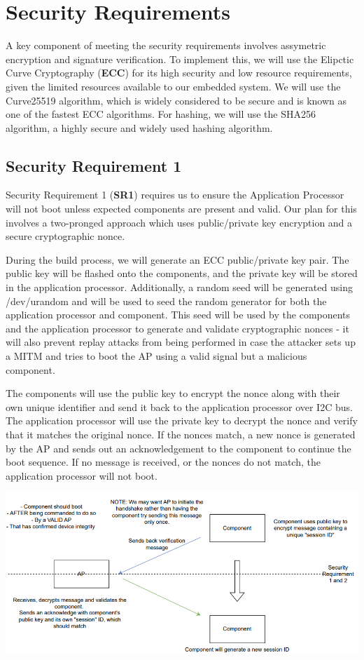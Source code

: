 \documentclass{prace}
\begin{document}
\section{Security Requirements}

A key component of meeting the security requirements involves assymetric encryption and signature
verification. To implement this, we will use the Elipctic Curve Cryptography (\textbf{ECC}) for
its high security and low resource requirements, given the limited resources available to our
embedded system. We will use the Curve25519 algorithm, which is widely considered to be secure
and is known as one of the fastest ECC algorithms. For hashing, we will use the SHA256 algorithm,
a highly secure and widely used hashing algorithm.

\subsection{Security Requirement 1}
Security Requirement 1 (\textbf{SR1}) requires us to ensure the Application Processor will not boot unless
expected components are present and valid. Our plan for this involves a two-pronged approach
which uses public/private key encryption and a secure cryptographic nonce.

During the build process, we will generate an ECC public/private key pair. The public key will be
flashed onto the components, and the private key will be stored in the application processor.
Additionally, a random seed will be generated using /dev/urandom and will be used to seed the
random generator for both the application processor and component. This seed will be used by the components and the application processor to generate
and validate cryptographic nonces - it will also prevent replay attacks from being performed in case the attacker sets up a MITM and tries to boot the AP using a valid signal but a malicious component.

The components will use the public key to encrypt the nonce along with their own
unique identifier and send it back to the application processor over I2C bus. The application
processor will use the private key to decrypt the nonce and verify that it matches the original
nonce. If the nonces match, a new nonce is generated by the AP and sends out an acknowledgement to the component to continue the boot sequence. If no message is received, or the nonces do not match, the application
processor will not boot.

\includegraphics[scale=0.8]{./diagramSR12.png}
\end{document}
